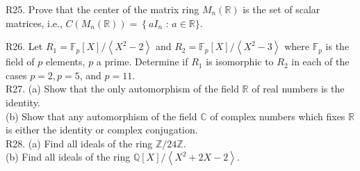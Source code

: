 R25. Prove that the center of the matrix ring $M_{n}(\mathbb{R})$ is the set of scalar matrices, i.e., $C\left(M_{n}(\mathbb{R})\right)=\left\{a I_{n}\right.$ : $a \in \mathbb{R}\}$.

R26. Let $R_{1}=\mathbb{F}_{p}[X] /\left\langle X^{2}-2\right\rangle$ and $R_{2}=\mathbb{F}_{p}[X] /\left\langle X^{2}-3\right\rangle$ where $\mathbb{F}_{p}$ is the field of $p$ elements, $p$ a prime. Determine if $R_{1}$ is isomorphic to $R_{2}$ in each of the cases $p=2, p=5$, and $p=11$.\\
R27. (a) Show that the only automorphism of the field $\mathbb{R}$ of real numbers is the identity.\\
(b) Show that any automorphism of the field $\mathbb{C}$ of complex numbers which fixes $\mathbb{R}$ is either the identity or complex conjugation.\\
R28. (a) Find all ideals of the ring $\mathbb{Z} / 24 \mathbb{Z}$.\\
(b) Find all ideals of the ring $\mathbb{Q}[X] /\left\langle X^{2}+2 X-2\right\rangle$.

